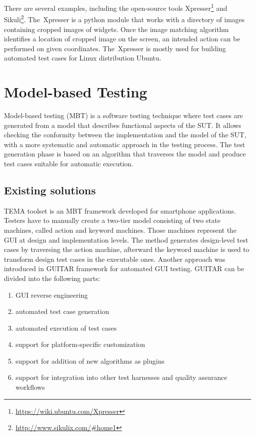 There are several examples, including the open-source tools Xpresser\footnote{\url{https://wiki.ubuntu.com/Xpresser}} and Sikuli\footnote{\url{http://www.sikulix.com/\#home1}}. The~Xpresser is a python module that works with a directory of images containing cropped images of widgets. Once the image matching algorithm identifies a location of cropped image on the screen, an intended action can be performed on given coordinates.\cite{xpresser} The~Xpresser is mostly used for building automated test cases for Linux distribution Ubuntu.

\section{Model-based Testing}
Model-based testing (MBT) is a software testing technique where test cases are generated from a model that describes functional aspects of the SUT. It allows checking the conformity between the implementation and the model of the SUT, with a more systematic and automatic approach in the testing process. The test generation phase is based on an algorithm that traverses the model and produce test cases suitable for automatic execution.\cite{embedded}

\subsection{Existing solutions}\label{TEMA_TOOLSET}
TEMA toolset is an MBT framework developed for smartphone applications. Testers have to manually create a two-tier model consisting of two state machines, called action and keyword machines. Those machines represent the GUI at design and implementation levels. The method generates design-level test cases by traversing the action machine, afterward the keyword machine is used to transform design test cases in the executable ones.\cite{TEMA}
\newpage
Another approach was introduced in GUITAR\cite{NguyenBao2014Gait} framework for automated GUI testing. GUITAR can be divided into the following parts:
\begin{enumerate}
    \item GUI reverse engineering
    \item automated test case generation
    \item automated execution of test cases
    \item support for platform-specific customization
    \item support for addition of new algorithms as plugins
    \item support for integration into other test harnesses and quality assurance workflows
\end{enumerate}


